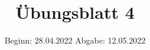 

\title{Übungsblatt 4}
\date{%
  Beginn: 28.04.2022
  \hspace{3em}
  Abgabe: 12.05.2022
}



\maketitle
\thispagestyle{empty}
\tableofcontents
\newpage

%



